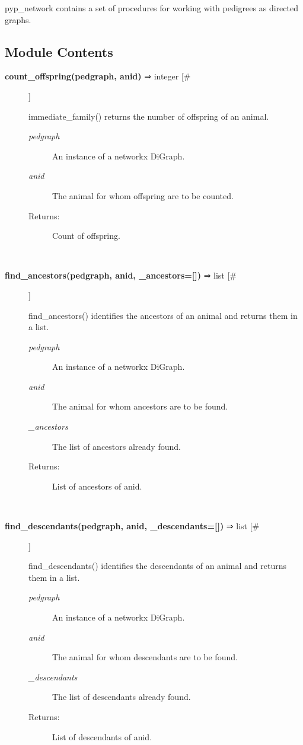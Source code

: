 

 pyp\_network contains a set of procedures for working with pedigrees as directed graphs.
\subsection*{Module Contents}
\begin{description}
\item[\textbf{count\_offspring(pedgraph, anid)}
 ⇒ integer [\#]]

 immediate\_family() returns the number of offspring of an animal.
\begin{description}
\item[\emph{pedgraph}
] An instance of a networkx DiGraph.
\item[\emph{anid}
] The animal for whom offspring are to be counted.
\item[Returns:] Count of offspring.

\end{description}
\\ 

\item[\textbf{find\_ancestors(pedgraph, anid, \_ancestors=[])}
 ⇒ list [\#]]

 find\_ancestors() identifies the ancestors of an animal and returns them in a list.
\begin{description}
\item[\emph{pedgraph}
] An instance of a networkx DiGraph.
\item[\emph{anid}
] The animal for whom ancestors are to be found.
\item[\emph{\_ancestors}
] The list of ancestors already found.
\item[Returns:] List of ancestors of anid.

\end{description}
\\ 

\item[\textbf{find\_descendants(pedgraph, anid, \_descendants=[])}
 ⇒ list [\#]]

 find\_descendants() identifies the descendants of an animal and returns them in a list.
\begin{description}
\item[\emph{pedgraph}
] An instance of a networkx DiGraph.
\item[\emph{anid}
] The animal for whom descendants are to be found.
\item[\emph{\_descendants}
] The list of descendants already found.
\item[Returns:] List of descendants of anid.


\end{description}
\end{description}
